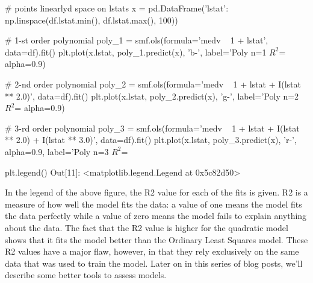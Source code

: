 \begin{frame}[fragile]
	\Large
# points linearlyd space on lstats
x = pd.DataFrame({'lstat': np.linspace(df.lstat.min(), df.lstat.max(), 100)})

# 1-st order polynomial
poly_1 = smf.ols(formula='medv ~ 1 + lstat', data=df).fit()
plt.plot(x.lstat, poly_1.predict(x), 'b-', label='Poly n=1 $R^2$=%
         alpha=0.9)
\end{frame}

\begin{frame}[fragile]
	\Large
# 2-nd order polynomial
poly_2 = smf.ols(formula='medv ~ 1 + lstat + I(lstat ** 2.0)', data=df).fit()
plt.plot(x.lstat, poly_2.predict(x), 'g-', label='Poly n=2 $R^2$=%
         alpha=0.9)

# 3-rd order polynomial
poly_3 = smf.ols(formula='medv ~ 1 + lstat + I(lstat ** 2.0) + I(lstat ** 3.0)', data=df).fit()
plt.plot(x.lstat, poly_3.predict(x), 'r-', alpha=0.9,
         label='Poly n=3 $R^2$=%
\end{frame}

\begin{frame}[fragile]
	\Large
plt.legend()
Out[11]:
<matplotlib.legend.Legend at 0x5c82d50>
\end{frame}

\begin{frame}[fragile]
	\Large
In the legend of the above figure, the R2 value for each of the fits is given. R2 is a measure of how well the model fits the data: a value of one means the model fits the data perfectly while a value of zero means the model fails to explain anything about the data. The fact that the R2 value is higher for the quadratic model shows that it fits the model better than the Ordinary Least Squares model. These R2 values have a major flaw, however, in that they rely exclusively on the same data that was used to train the model. Later on in this series of blog posts, we’ll describe some better tools to assess models.
\end{frame}


